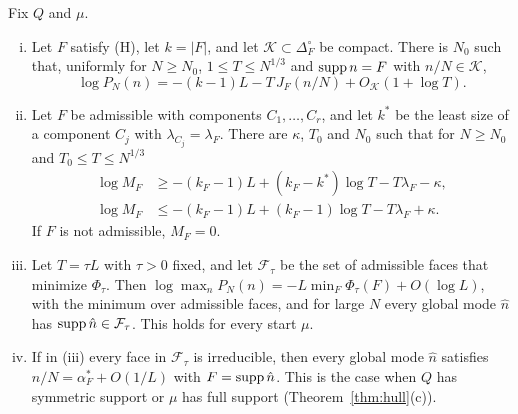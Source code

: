 \begin{theorem}\label{thm:first}
Fix $Q$ and $\mu$.
\begin{enumerate}[(i)]
\item Let $F$ satisfy \textup{(H)}, let $k=\lvert F\rvert$, and let
$\mathcal K\subset\Delta_F^\circ$ be compact. There is $N_0$ such that,
uniformly for $N\ge N_0$, $1\le T\le N^{1/3}$ and $\operatorname{supp} n=F$ with
$n/N\in\mathcal K$,
\[
 \log P_N(n)=-(k-1)L-T\,J_F(n/N)+O_{\mathcal K}(1+\log T).
\]
\item Let $F$ be admissible with components $C_1,\dots,C_r$, and let $k^*$ be
the least size of a component $C_j$ with $\lambda_{C_j}=\lambda_F$. There are
$\kappa$, $T_0$ and $N_0$ such that for $N\ge N_0$ and $T_0\le T\le N^{1/3}$
\begin{align*}
 \log M_F&\ge-(k_F-1)L+(k_F-k^*)\log T-T\lambda_F-\kappa,\\
 \log M_F&\le-(k_F-1)L+(k_F-1)\log T-T\lambda_F+\kappa.
\end{align*}
If $F$ is not admissible, $M_F=0$.
\item Let $T=\tau L$ with $\tau>0$ fixed, and let $\mathcal F_\tau$ be the set
of admissible faces that minimize $\Phi_\tau$. Then
$\log\max_nP_N(n)=-L\min_F\Phi_\tau(F)+O(\log L)$, with the minimum over
admissible faces, and for large $N$ every global mode $\hat n$ has
$\operatorname{supp}\hat n\in\mathcal F_\tau$. This holds for every start $\mu$.
\item If in (iii) every face in $\mathcal F_\tau$ is irreducible, then every
global mode $\hat n$ satisfies $\hat n/N=\alpha^*_F+O(1/L)$ with
$F=\operatorname{supp}\hat n$. This is the case when $Q$ has symmetric support or $\mu$ has
full support (Theorem~\ref{thm:hull}(c)).
\end{enumerate}
\end{theorem}

